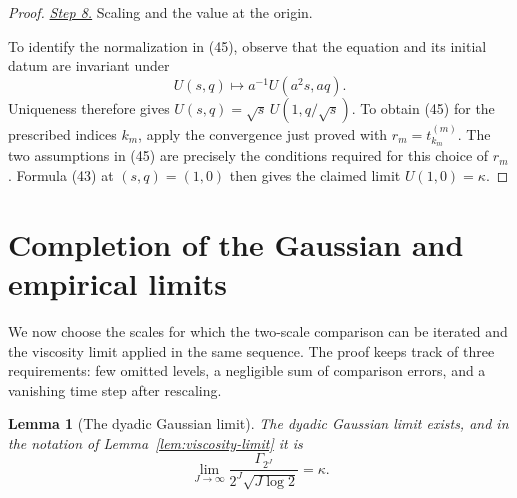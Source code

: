 \documentclass{smfart}
\newtheorem{lemma}[theorem]{Lemma}
\theoremstyle{definition}
\newcommand{\1}{\mathbf 1}
\begin{document}
\begin{proof}
\smallskip\noindent
\underline{\textit{Step 8.}} Scaling and the value at the origin.

To identify the normalization in (45), observe that the equation and
its initial datum are invariant under
\begin{equation*}
U(s,q)\mapsto a^{-1}U(a^2s,aq).
\end{equation*}
Uniqueness therefore gives
$U(s,q)=\sqrt s\,U(1,q/\sqrt s)$.  To obtain (45) for the prescribed
indices $k_m$, apply the convergence just proved with
$r_m=t_{k_m}^{(m)}$.  The two assumptions in (45) are precisely the
conditions required for this choice of $r_m$.  Formula (43) at
$(s,q)=(1,0)$ then gives the claimed limit $U(1,0)=\kappa$.

\end{proof}

\section{Completion of the Gaussian and empirical limits}\label{sec:conclusion}

We now choose the scales for which the two-scale comparison can be iterated
and the viscosity limit applied in the same sequence.  The proof keeps
track of three requirements: few omitted levels, a negligible sum of
comparison errors, and a vanishing time step after rescaling.

\begin{lemma}[The dyadic Gaussian limit]\label{lem:dyadic-gaussian-limit}
The dyadic Gaussian limit exists, and in the notation of Lemma~\ref{lem:viscosity-limit} it is
\begin{equation}
\lim_ {J\to\infty}
\frac{\Gamma_ {2^J}}{2^J\sqrt{J\log2}}=\kappa.
\tag{49}
\end{equation}

\end{lemma}
\end{document}
